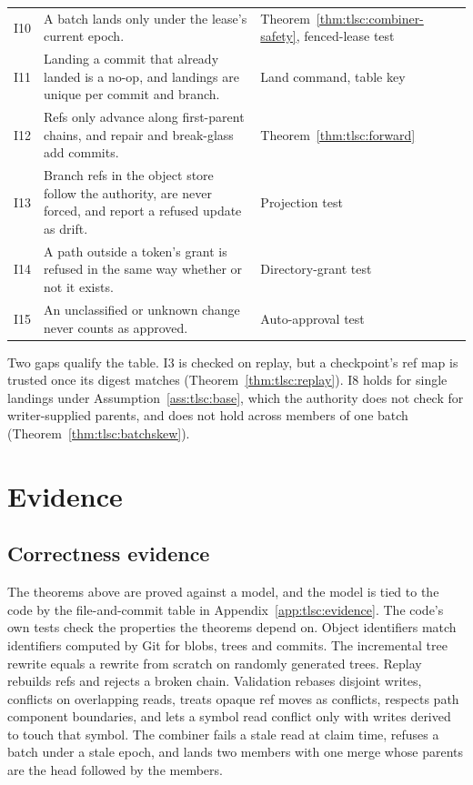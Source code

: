 \documentclass[11pt,letterpaper]{article}
\theoremstyle{definition}
\theoremstyle{remark}
\begin{document}
\begin{table}[t]
\begin{tabularx}{\textwidth}{@{}l X L{4.6cm}@{}}
I10 & A batch lands only under the lease's current epoch. & Theorem~\ref{thm:tlsc:combiner-safety}, fenced-lease test \\
I11 & Landing a commit that already landed is a no-op, and landings are unique per commit and branch. & Land command, table key \\
I12 & Refs only advance along first-parent chains, and repair and break-glass add commits. & Theorem~\ref{thm:tlsc:forward} \\
I13 & Branch refs in the object store follow the authority, are never forced, and report a refused update as drift. & Projection test \\
I14 & A path outside a token's grant is refused in the same way whether or not it exists. & Directory-grant test \\
I15 & An unclassified or unknown change never counts as approved. & Auto-approval test \\
\bottomrule
\end{tabularx}
\end{table}

Two gaps qualify the table. I3 is checked on replay, but a checkpoint's ref map is trusted once its digest matches (Theorem~\ref{thm:tlsc:replay}). I8 holds for single landings under Assumption~\ref{ass:tlsc:base}, which the authority does not check for writer-supplied parents, and does not hold across members of one batch (Theorem~\ref{thm:tlsc:batchskew}).

\section{Evidence}
\label{sec:tlsc:evidence}

\subsection{Correctness evidence}

The theorems above are proved against a model, and the model is tied to the code by the file-and-commit table in Appendix~\ref{app:tlsc:evidence}. The code's own tests check the properties the theorems depend on. Object identifiers match identifiers computed by Git for blobs, trees and commits. The incremental tree rewrite equals a rewrite from scratch on randomly generated trees. Replay rebuilds refs and rejects a broken chain. Validation rebases disjoint writes, conflicts on overlapping reads, treats opaque ref moves as conflicts, respects path component boundaries, and lets a symbol read conflict only with writes derived to touch that symbol. The combiner fails a stale read at claim time, refuses a batch under a stale epoch, and lands two members with one merge whose parents are the head followed by the members.
\end{document}
